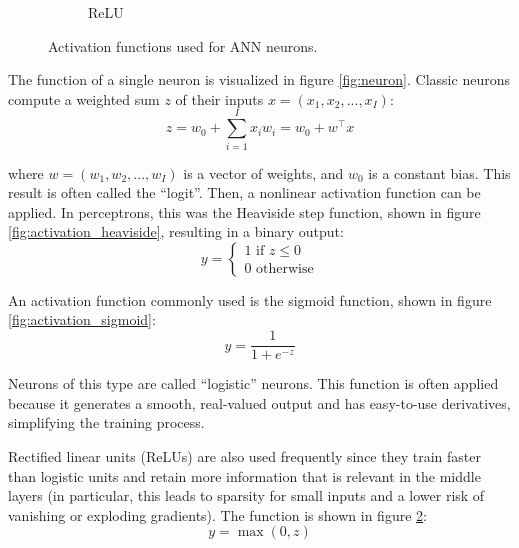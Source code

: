 \begin{figure}
\begin{subfigure}[t]{0.3\textwidth}
                    \caption{ReLU}%
                    \label{fig:activation_relu}
                \end{subfigure}
                \caption{Activation functions used for ANN neurons. \cite{medium}}
            \end{figure}
                  
               
            The function of a single neuron is visualized in figure \ref{fig:neuron}. 
            Classic neurons compute a weighted sum $z$ of their inputs $x = (x_1,x_2,...,x_I)$:
            \begin{equation}
                z = w_0 + \sum_{i=1}^I x_i w_i = w_0 + w^\top x
            \end{equation}

            where $w = (w_1,w_2,...,w_I)$ is a vector of weights, and $w_0$ is a constant bias. 
            This result is often called the ``logit''. 
            Then, a nonlinear activation function can be applied. 
            In perceptrons, this was the Heaviside step function, shown in figure \ref{fig:activation_heaviside}, resulting in a binary output:
            \begin{equation}
                y = \begin{cases}
                    1 \text{ if } z \leq 0\\
                    0 \text{ otherwise}
                \end{cases}       
            \end{equation}

            An activation function commonly used is the sigmoid function, shown in figure \ref{fig:activation_sigmoid}:
            \begin{equation}
                y = \frac{1}{1 + e^{-z}}
            \end{equation}

            Neurons of this type are called ``logistic'' neurons. 
            This function is often applied because it generates a smooth, real-valued output and has easy-to-use derivatives, simplifying the training process.

            Rectified linear units (ReLUs) are also used frequently since they train faster than logistic units and retain more information that is relevant in the middle layers (in particular, this leads to sparsity for small inputs and a lower risk of vanishing or exploding gradients). 
            The function is shown in figure \ref{fig:activation_relu}:
            \begin{equation}
                y = \max(0, z)
            \end{equation}

